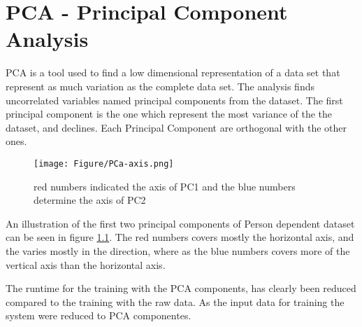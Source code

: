 \chapter{PCA - Principal Component Analysis}
PCA is a tool used to find a low dimensional representation of a data set that represent as much variation as the complete data set.   The analysis finds uncorrelated variables named principal components from the dataset.  The first principal component is the one which represent the most variance of the the dataset, and declines.  Each Principal Component are orthogonal with the other ones. 

\begin{figure}[H]
\centering
\texttt{[image: Figure/PCa-axis.png]}
\caption{ red numbers indicated the axis of PC1 and the blue numbers determine the axis of PC2}
\label{fig:pca_vis}
\end{figure}

An illustration of the first two principal components of Person dependent dataset can be seen in figure \ref{fig:pca_vis}.  The red numbers covers mostly the horizontal axis, and the varies mostly in the direction, where as the blue numbers  covers more of the vertical axis than the horizontal axis. 





\begin{figure}
  \hspace*{\fill}%
  \hfill%
  \hspace*{\fill}%
\end{figure}


The runtime for the training with the PCA components, has clearly been reduced compared to the training with the raw data. As the input data for training the system were reduced to PCA componentes. 


